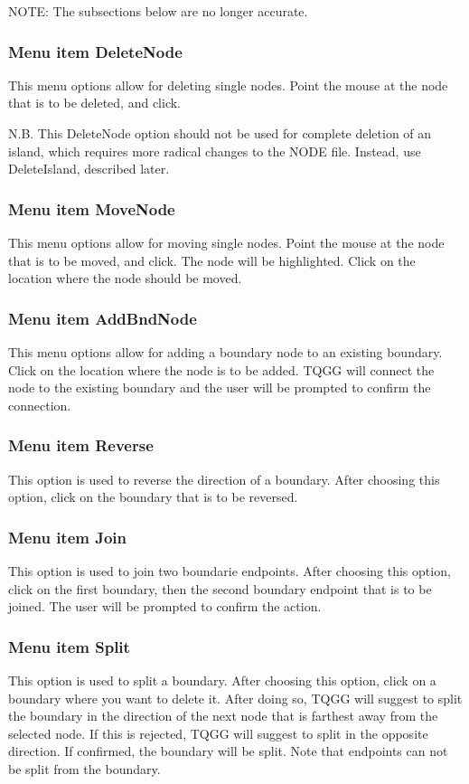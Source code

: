 \documentclass{article}
\begin{document}
NOTE: The subsections below are no longer accurate.
\
\subsubsection[Menu item DeleteNode]{Menu item DeleteNode}
This menu options allow for deleting single nodes. Point the mouse at the node that is to be deleted, and click.

N.B. This DeleteNode option should not be used for complete deletion of an island, which requires more radical changes to the NODE file. Instead, use DeleteIsland, described later.

\subsubsection[Menu item MoveNode]{Menu item MoveNode}
This menu options allow for moving single nodes. Point the mouse at the node that is to be moved, and click. The node will be highlighted. Click on the location where the node should be moved.

\subsubsection[Menu item AddBndNode]{Menu item AddBndNode}
This menu options allow for adding a boundary node to an existing boundary. Click on the location where the node is to be added. TQGG will connect the node to the existing boundary and the user will be prompted to confirm the connection.

\subsubsection[Menu item Reverse]{Menu item Reverse}
This option is used to reverse the direction of a boundary. After choosing this option, click on the boundary that is to be reversed.

\subsubsection[Menu item Join]{Menu item Join}
This option is used to join two boundarie endpoints. After choosing this option, click on the first boundary, then the second boundary endpoint that is to be joined. The user will be prompted to confirm the action.

\subsubsection[Menu item Split]{Menu item Split}
This option is used to split a boundary. After choosing this option, click on a boundary where you want to delete it. After doing so, TQGG will suggest to split the boundary in the direction of the next node that is farthest away from the selected node. If this is rejected, TQGG will suggest to split in the opposite direction. If confirmed, the boundary will be split. Note that endpoints can not be split from the boundary.
\end{document}
